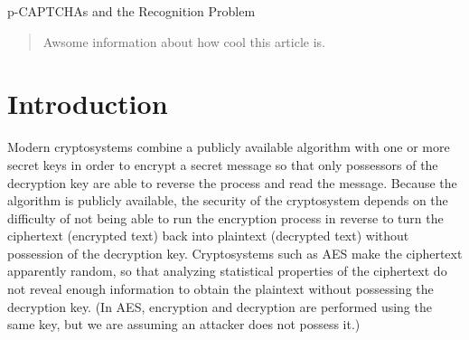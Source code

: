 \documentclass[12pt]{article}
\begin{document}
\begin{center}p-CAPTCHAs and the Recognition Problem\end{center}


% 

\begin{abstract}
Awsome information about how cool this article is.
\end{abstract}

\section*{Introduction}
	Modern cryptosystems combine a publicly available algorithm with one or more secret keys in order to encrypt a secret message so that only possessors of the decryption key are able to reverse the process and read the message. Because the algorithm is publicly available, the security of the cryptosystem depends on the difficulty of not being able to run the encryption process in reverse to turn the ciphertext (encrypted text) back into plaintext (decrypted text) without possession of the decryption key. Cryptosystems such as AES make the ciphertext apparently random, so that analyzing statistical properties of the ciphertext do not reveal enough information to obtain the plaintext without possessing the decryption key. (In AES, encryption and decryption are performed using the same key, but we are assuming an attacker does not possess it.)
\end{document}
